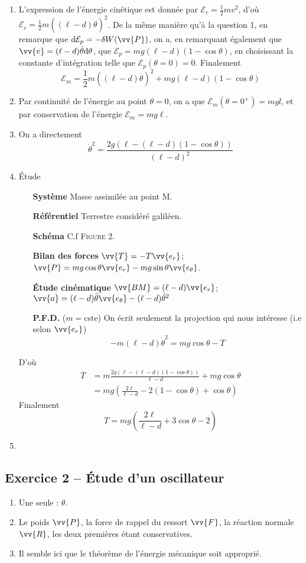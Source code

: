 \documentclass[17pt]{article}
\def\Em{\mathcal{E}_m}
\def\Ec{\mathcal{E}_c}
\def\Ep{\mathcal{E}_p}
\begin{document}
	\begin{enumerate}[start=3]
		\item L'expression de l'énergie cinétique est donnée par $\Ec=\frac12mv^2$, d'où $\Ec=\boxed{\frac12m((\ell-d)\dot{\theta})^2}$. De la même manière qu'à la question 1, en remarque que $\dd \Ep=-\delta W(\vv{P})$, on a, en remarquant également que $\vv{v}=(\ell-d)\dot{\theta}\dd\theta$, que $\boxed{\Ep=mg(\ell-d)(1-\cos\theta)}$, en choisissant la constante d'intégration telle que $\Ep(\theta=0)=0$. Finalement \[\boxed{\Em=\frac12m((\ell-d)\dot{\theta})^2+mg(\ell-d)(1-\cos\theta)}\]
		\item Par continuité de l'énergie au point $\theta=0$, on a que $\Em(\theta=0^+)=mgl$, et par conservation de l'énergie $\Em=mg\ell$.
		\item On a directement \[\boxed{\dot{\theta}^2=\frac{2g(\ell-(\ell-d)(1-\cos\theta))}{(\ell-d)^2}}\]
		\item Étude
		\begin{itemize}
			\item[\textbf{Système}] Masse assimilée au point M.
			\item[\textbf{Référentiel}] Terrestre considéré galiléen.
			\item[\textbf{Schéma}] C.f \textsc{Figure 2}.
			\item[\textbf{Bilan des forces}] $\vv{T}=-T\vv{e_r}$; $\vv{P}=mg\cos\theta\vv{e_r}-mg\sin\theta\vv{e_\theta}$.
			\item[\textbf{Étude cinématique}] $\vv{BM}=(\ell-d)\vv{e_r}$; $\vv{a}=(\ell-d)\ddot{\theta}\vv{e_\theta}-(\ell-d)\dot{\theta}^2$
			\item[\textbf{P.F.D.}] ($m=$cste) On écrit seulement la projection qui nous intéresse (i.e selon $\vv{e_r}$) 
			\[-m(\ell-d)\dot{\theta}^2=mg\cos\theta-T\]
		\end{itemize}
		\newpage
		D'où 
		\begin{align*}
			T &= m\frac{2g(\ell-(\ell-d)(1-\cos\theta))}{\ell-d}+mg\cos\theta\\
			  &= mg\left(\frac{2\ell}{\ell-d}-2(1-\cos\theta)+\cos\theta\right)
		\end{align*}
		Finalement \[\boxed{T=mg\left(\frac{2\ell}{\ell-d}+3\cos\theta-2\right)}\]
		\item 
	\end{enumerate}
	\subsection*{Exercice 2 – Étude d'un oscillateur}
	\begin{enumerate}
		\item Une seule : $\theta$.
		\item Le poids $\vv{P}$, la force de rappel du ressort $\vv{F}$, la réaction normale $\vv{R}$, les deux premières étant conservatives.
		\item Il semble ici que le théorème de l'énergie mécanique soit approprié.
	\end{enumerate}
\end{document}
